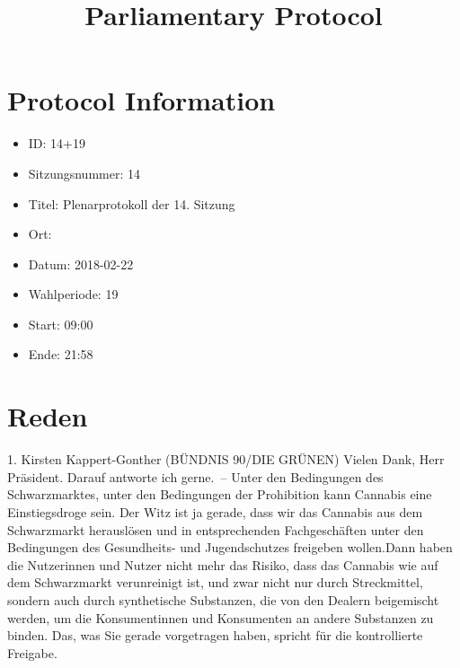 \documentclass{article}
\title{Parliamentary Protocol}
\begin{document}
    \maketitle
    \section{Protocol Information}
    \begin{itemize}
        \item ID: 14+19
        \item Sitzungsnummer: 14
        \item Titel: Plenarprotokoll der 14. Sitzung
        \item Ort: 
        \item Datum: 2018-02-22
        \item Wahlperiode: 19
        \item Start: 09:00
        \item Ende: 21:58
    \end{itemize}
    \section{Reden}





	1. Kirsten Kappert-Gonther (BÜNDNIS 90/DIE GRÜNEN) Vielen Dank, Herr Präsident. Darauf antworte ich gerne. – Unter den Bedingungen des Schwarzmarktes, unter den Bedingungen der Prohibition kann Cannabis eine Einstiegsdroge sein. Der Witz ist ja gerade, dass wir das Cannabis aus dem Schwarzmarkt herauslösen und in entsprechenden Fachgeschäften unter den Bedingungen des Gesundheits- und Jugendschutzes freigeben wollen.Dann haben die Nutzerinnen und Nutzer nicht mehr das Risiko, dass das Cannabis wie auf dem Schwarzmarkt verunreinigt ist, und zwar nicht nur durch Streckmittel, sondern auch durch synthetische Substanzen, die von den Dealern beigemischt werden, um die Konsumentinnen und Konsumenten an andere Substanzen zu binden. Das, was Sie gerade vorgetragen haben, spricht für die kontrollierte Freigabe.
\end{document}
